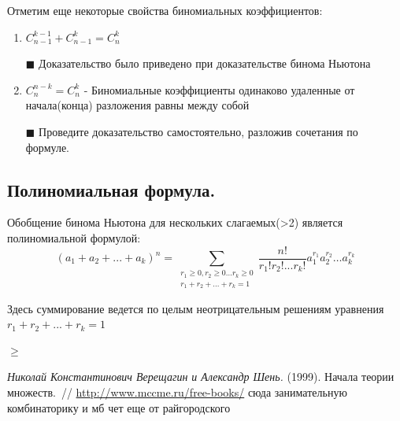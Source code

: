 \documentclass[12pt, a4paper]{article}
\begin{document}
Отметим еще некоторые свойства биномиальных коэффициентов:

\begin{enumerate}

\item $C_{n-1}^{k-1} + C_{n-1}^{k} = C_{n}^{k} $

\(\blacksquare\) Доказательство было приведено при доказательстве бинома Ньютона%

\item $C_{n}^{n-k} = C_{n}^{k}$ - Биномиальные коэффициенты одинаково удаленные от начала(конца) разложения равны между собой

\(\blacksquare\) Проведите доказательство самостоятельно, разложив сочетания по формуле.

\end{enumerate}

\subsection{Полиномиальная формула.}

Обобщение бинома Ньютона для нескольких слагаемых(>2) является полиномиальной формулой:
\[
(a_1 + a_2 + ... + a_k)^n = \sum\limits_{\substack{r_1\geq 0,r_2\geq 0...r_k\geq 0 \\ r_1+r_2+...+r_k=1 }} \frac{n!}{r_1!r_2!...r_k!} a_1^{r_1} a_2^{r_2} \dotsc a_k^{r_k}
\]



Здесь суммирование ведется по целым неотрицательным решениям уравнения $r_1+r_2+...+r_k=1$ 

$\geq$









\begin{thebibliography}{1}
	\emph{Николай Константинович Верещагин и Александр Шень.} (1999).
	Начала теории множеств.~//
	\url{http://www.mccme.ru/free-books/}
  сюда занимательную комбинаторику и мб чет еще от райгородского
\end{thebibliography}
\end{document}
